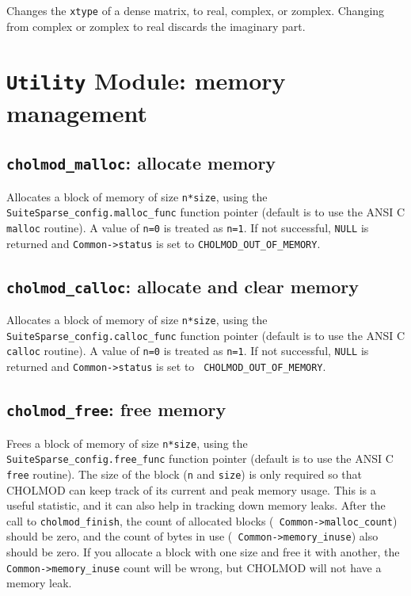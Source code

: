 \documentclass[11pt]{article}
\begin{document}

Changes the {\tt xtype} of a dense matrix, to real, complex, or zomplex.
Changing from complex or zomplex to real discards the imaginary part.

\newpage \section{{\tt Utility} Module: memory management}

\subsection{{\tt cholmod\_malloc}: allocate memory}


Allocates a block of memory of size {\tt n*size}, using the {\tt
SuiteSparse\_config.malloc\_func} function pointer (default is to use the ANSI
C {\tt malloc} routine).  A value of {\tt n=0} is treated as {\tt n=1}.
If not successful, {\tt NULL} is returned and {\tt Common->status} is set to
{\tt CHOLMOD\_OUT\_OF\_MEMORY}.

\subsection{{\tt cholmod\_calloc}: allocate and clear memory}


Allocates a block of memory of size {\tt n*size}, using the {\tt
SuiteSparse\_config.calloc\_func} function pointer (default is to use the ANSI
C {\tt calloc} routine).  A value of {\tt n=0} is treated as {\tt n=1}.  If not
successful, {\tt NULL} is returned and {\tt Common->status} is set to {\tt
CHOLMOD\_OUT\_OF\_MEMORY}.

\subsection{{\tt cholmod\_free}: free memory}


Frees a block of memory of size {\tt n*size}, using the {\tt
SuiteSparse\_config.free\_func} function pointer (default is to use the ANSI C
{\tt free} routine).  The size of the block ({\tt n} and {\tt size}) is only
required so that CHOLMOD can keep track of its current and peak memory usage.
This is a useful statistic, and it can also help in tracking down memory leaks.
After the call to {\tt cholmod\_finish}, the count of allocated blocks ({\tt
Common->malloc\_count}) should be zero, and the count of bytes in use ({\tt
Common->memory\_inuse}) also should be zero.  If you allocate a block with one
size and free it with another, the {\tt Common->memory\_inuse} count will be
wrong, but CHOLMOD will not have a memory leak.
\end{document}

